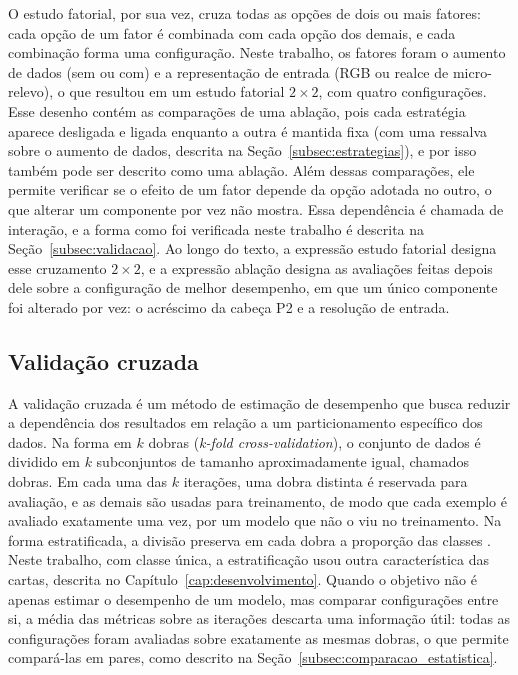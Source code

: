 \documentclass[
    12pt,                %
    openright,           %
    oneside,             %
    a4paper,             %
    english,             %
    brazil               %
]{abntex2}
\begin{document}
O estudo fatorial, por sua vez, cruza todas as opções de dois ou
mais fatores: cada opção de um fator é combinada com cada opção
dos demais, e cada combinação forma uma configuração. Neste
trabalho, os fatores foram o aumento de dados (sem ou com) e a
representação de entrada (RGB ou realce de micro-relevo), o que
resultou em um estudo fatorial $2 \times 2$, com quatro
configurações. Esse desenho contém as comparações de uma
ablação, pois cada estratégia aparece desligada e ligada
enquanto a outra é mantida fixa (com uma ressalva sobre o aumento de
dados, descrita na Seção~\ref{subsec:estrategias}), e por isso também pode ser
descrito como uma ablação. Além dessas comparações, ele permite
verificar se o efeito de um fator depende da opção adotada no
outro, o que alterar um componente por vez não mostra. Essa
dependência é chamada de interação, e a forma como foi verificada neste
trabalho é descrita na Seção~\ref{subsec:validacao}. Ao longo do
texto, a expressão estudo fatorial designa esse cruzamento
$2 \times 2$, e a expressão ablação designa as avaliações feitas
depois dele sobre a configuração de melhor desempenho, em que um
único componente foi alterado por vez: o acréscimo da cabeça P2 e a
resolução de entrada.

\subsection{Validação cruzada}
\label{subsec:validacao_cruzada}

A validação cruzada é um método de estimação de desempenho que busca
reduzir a dependência dos resultados em relação a um particionamento
específico dos dados. Na forma em $k$ dobras
(\textit{k-fold cross-validation}), o conjunto de dados é dividido em
$k$ subconjuntos de tamanho aproximadamente igual, chamados dobras. Em
cada uma das $k$ iterações, uma dobra distinta é reservada para
avaliação, e as demais são usadas para treinamento, de modo que cada
exemplo é avaliado exatamente uma vez, por um modelo que não o viu no
treinamento. Na forma estratificada, a divisão preserva em cada
dobra a proporção das classes \cite{Kohavi1995}. Neste trabalho, com
classe única, a estratificação usou outra característica das cartas,
descrita no Capítulo~\ref{cap:desenvolvimento}. Quando o objetivo
não é apenas estimar o desempenho de um modelo, mas comparar
configurações entre si, a média das métricas sobre as iterações
descarta uma informação útil: todas as configurações foram avaliadas
sobre exatamente as mesmas dobras, o que permite compará-las em
pares, como descrito na Seção~\ref{subsec:comparacao_estatistica}.
\end{document}
